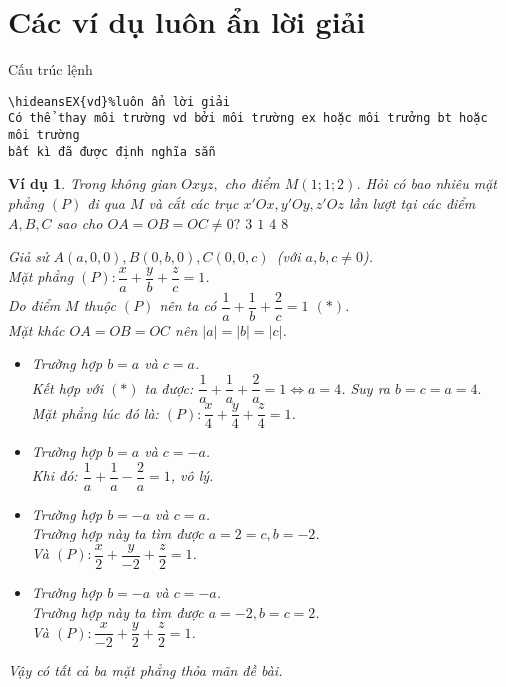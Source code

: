 \documentclass[12pt,a4paper,oneside]{article}
\newtheorem{vd}{Ví dụ}
\begin{document}
\section{Các ví dụ luôn ẩn lời giải}
Cấu trúc lệnh
\begin{verbatim}
\hideansEX{vd}%luôn ẩn lời giải
Có thể thay môi trường vd bởi môi trường ex hoặc môi trưởng bt hoặc môi trường 
bất kì đã được định nghĩa sẵn
\end{verbatim}
\begin{vd}%
	Trong không gian $ Oxyz, $ cho điểm $ M(1;1;2) $. Hỏi có bao nhiêu mặt phẳng $ (P) $ đi qua $ M $ và cắt các trục $ x'Ox, y'Oy, z'Oz $ lần lượt tại các điểm $ A, B, C $ sao cho $ OA = OB = OC \ne 0? $
	\choice
	{\True $ 3 $}
	{$ 1 $}
	{$ 4 $}
	{$ 8 $}
	\loigiai
	{
		Giả sử $ A(a,0,0), B(0,b,0), C(0,0,c) $\, (với $ a,b,c \ne 0 $).\\
		Mặt phẳng $ (P): \dfrac{x}{a} + \dfrac{y}{b} + \dfrac{z}{c} = 1 $.\\
		Do điểm $ M $ thuộc $ (P) $ nên ta có $ \dfrac{1}{a} + \dfrac{1}{b} + \dfrac{2}{c} = 1$ $(*)$.\\
		Mặt khác $ OA = OB = OC  $ nên $ |a| =|b|=|c|  $.
		\begin{itemize}
			\item Trường hợp $ b=a$ và $c=a$.\\
			Kết hợp với $(*)$ ta được: $\dfrac{1}{a} + \dfrac{1}{a} + \dfrac{2}{a} = 1\Leftrightarrow a = 4$. Suy ra $ b = c=a=4. $\\
			Mặt phẳng lúc đó là: $ (P): \dfrac{x}{4} + \dfrac{y}{4} + \dfrac{z}{4} = 1 $.
			\item Trường hợp $ b=a$ và $c=-a$. \\
			Khi đó: $\dfrac{1}{a} +\dfrac{1}{a} - \dfrac{2}{a} = 1$, vô lý.
			\item Trường hợp $ b=-a$ và $c=a$.\\
			Trường hợp này ta tìm được $ a = 2 = c, b = -2 $. \\
			Và $ (P): \dfrac{x}{2} + \dfrac{y}{-2} + \dfrac{z}{2} = 1 $.
			\item Trường hợp $b=-a$ và $c=-a$.\\
			Trường hợp này ta tìm được $ a = -2, b = c = 2 $.\\
			Và $ (P): \dfrac{x}{-2} + \dfrac{y}{2} + \dfrac{z}{2} = 1 $.
		\end{itemize}
		Vậy có tất cả ba mặt phẳng thỏa mãn đề bài.
	}
\end{vd}		
\end{document}
